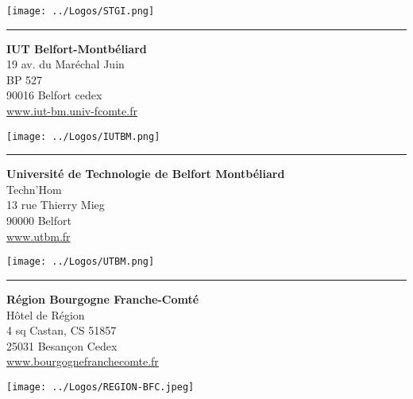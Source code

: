 \begin{minipage}{0.43\textwidth}
\centering \texttt{[image: ../Logos/STGI.png]}
\end{minipage}
\vspace{1.5mm}
\hrule
%
\vspace{1.5mm}
\noindent
\begin{minipage}{0.55\textwidth}
\textbf{IUT Belfort-Montbéliard}\\
19 av. du Maréchal Juin\\
BP 527\\
90016 Belfort cedex\\
\url{www.iut-bm.univ-fcomte.fr}
\end{minipage}
\begin{minipage}{0.43\textwidth}
\centering \texttt{[image: ../Logos/IUTBM.png]}
\end{minipage}
\vspace{1.5mm}
\hrule
%
\vspace{1.5mm}
\noindent
\begin{minipage}{0.55\textwidth}
\textbf{Université de Technologie de Belfort Montbéliard}\\
Techn'Hom\\
13 rue Thierry Mieg\\
90000 Belfort\\
\url{www.utbm.fr}
\end{minipage}
\begin{minipage}{0.43\textwidth}
	\centering \texttt{[image: ../Logos/UTBM.png]}
\end{minipage}
\vspace{1.5mm}
\hrule
%
\vspace{1.5mm}
\noindent
\begin{minipage}{0.55\textwidth}
\textbf{Région Bourgogne Franche-Comté}\\
Hôtel de Région\\
4 sq Castan, CS 51857\\
25031 Besançon Cedex\\
\url{www.bourgognefranchecomte.fr}
\end{minipage}
\begin{minipage}{0.43\textwidth}
	\centering \texttt{[image: ../Logos/REGION-BFC.jpeg]}
\end{minipage}
\vspace{1.5mm}

